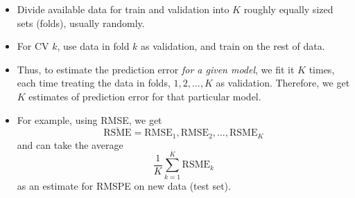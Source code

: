 \begin{itemize}
\begin{figure}[!ht]
          \end{figure}
          \begin{itemize}
              \item Divide available data for train and validation
                    into $ K $ roughly equally sized sets (folds),
                    usually randomly.
              \item For CV $ k $, use data in fold $ k $
                    as validation, and train on
                    the rest of data.
              \item Thus, to estimate the prediction error
                    \emph{for a given model}, we fit it $ K $ times, each
                    time treating the data in folds, $ 1,2,\ldots,K $
                    as validation.
                    Therefore, we get $ K $ estimates of prediction error
                    for that particular model.
              \item For example, using RMSE, we get
                    \[ \overline{\text{RSME}}
                        =\text{RMSE}_1,\text{RMSE}_2,\ldots,\text{RSME}_K \]
                    and can take the average
                    \[ \frac{1}{K} \sum_{k=1}^{K}\text{RSME}_k \]
                    as an estimate for RMSPE on new data (test set).
          \end{itemize}
\end{itemize}
